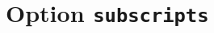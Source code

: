 \documentclass{article}
\begin{document}
\begin{dispExample}
\NewOverArrowCommand[picture]{\picvec}{}
\TestOverArrow*{\picvec}
\end{dispExample}

\section{Option \texttt{subscripts}}

\begin{dispExample}
\TestOverArrow*{\subvec}
\TestOverArrow*{\nosubvec}
\end{dispExample}
\end{document}
